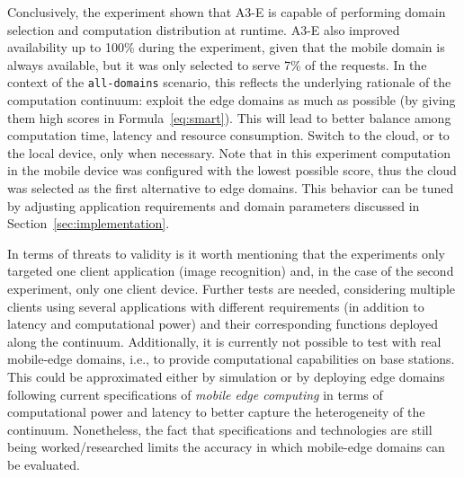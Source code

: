 Conclusively, the experiment shown that A3-E is capable of performing domain selection and computation distribution at runtime. A3-E also improved availability up to 100\% during the experiment, given that the mobile domain is always available, but it was only selected to serve 7\% of the requests.
In the context of the \texttt{all-domains} scenario, this reflects the underlying rationale of the computation continuum: exploit the edge domains as much as possible (by giving them high scores in Formula~\ref{eq:smart}). This will lead to better balance among computation time, latency and resource consumption. Switch to the cloud, or to the local device, only when necessary. Note that in this experiment computation in the mobile device was configured with the lowest possible score, thus the cloud was selected as the first alternative to edge domains. This behavior can be tuned by adjusting application requirements and domain parameters discussed in Section~\ref{sec:implementation}.




In terms of threats to validity is it worth mentioning that the experiments only targeted one client application (image recognition) and, in the case of the second experiment, only one client device. Further tests are needed, considering multiple clients using several applications with different requirements (in addition to latency and computational power) and their corresponding functions deployed along the continuum. Additionally, it is currently not possible to test with real mobile-edge domains, i.e., to provide computational capabilities on base stations. This could be approximated either by simulation or by deploying edge domains following current specifications of \textit{mobile edge computing} in terms of computational power and latency to better capture the heterogeneity of the continuum. Nonetheless, the fact that specifications and technologies are still being worked/researched limits the accuracy in which mobile-edge domains can be evaluated.  %



